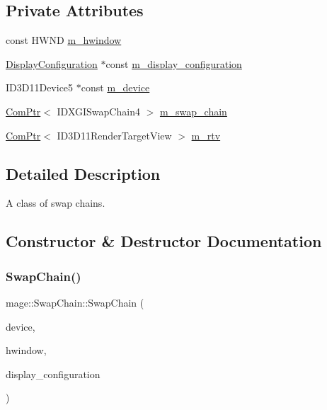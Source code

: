 \subsection*{Private Attributes}
\begin{DoxyCompactItemize}
\item 
const H\+W\+ND \hyperlink{classmage_1_1_swap_chain_aea5964cd3bd2bfef89ae428cceef82fd}{m\+\_\+hwindow}
\item 
\hyperlink{structmage_1_1_display_configuration}{Display\+Configuration} $\ast$const \hyperlink{classmage_1_1_swap_chain_ac1aa833943aa6bfe464da32316f7096f}{m\+\_\+display\+\_\+configuration}
\item 
I\+D3\+D11\+Device5 $\ast$const \hyperlink{classmage_1_1_swap_chain_a169f9613c42c3cad0ea83e9535676cd0}{m\+\_\+device}
\item 
\hyperlink{namespacemage_ae74f374780900893caa5555d1031fd79}{Com\+Ptr}$<$ I\+D\+X\+G\+I\+Swap\+Chain4 $>$ \hyperlink{classmage_1_1_swap_chain_a826bde72349ca10f7c60ca39d68dc2b2}{m\+\_\+swap\+\_\+chain}
\item 
\hyperlink{namespacemage_ae74f374780900893caa5555d1031fd79}{Com\+Ptr}$<$ I\+D3\+D11\+Render\+Target\+View $>$ \hyperlink{classmage_1_1_swap_chain_a87610dab11ac73b2e5c2510e013640ac}{m\+\_\+rtv}
\end{DoxyCompactItemize}


\subsection{Detailed Description}
A class of swap chains. 

\subsection{Constructor \& Destructor Documentation}
\hypertarget{classmage_1_1_swap_chain_a2ba9364220d9f8fa03b5bd99318d32dc}{}\label{classmage_1_1_swap_chain_a2ba9364220d9f8fa03b5bd99318d32dc} 
\subsubsection{\texorpdfstring{Swap\+Chain()}{SwapChain()}\hspace{0.1cm}{\footnotesize\ttfamily [1/3]}}
{\footnotesize\ttfamily mage\+::\+Swap\+Chain\+::\+Swap\+Chain (\begin{DoxyParamCaption}\item[{I\+D3\+D11\+Device5 $\ast$}]{device,  }\item[{H\+W\+ND}]{hwindow,  }\item[{\hyperlink{structmage_1_1_display_configuration}{Display\+Configuration} $\ast$}]{display\+\_\+configuration }\end{DoxyParamCaption})\hspace{0.3cm}{\ttfamily [explicit]}}


